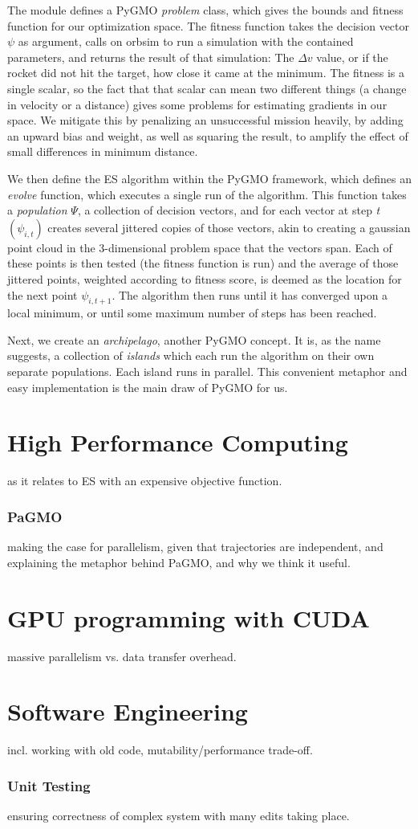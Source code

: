 The module defines a PyGMO \emph{problem} class, which gives the bounds and fitness function for our optimization space. The fitness function takes the decision vector \(\psi\) as argument, calls on orbsim to run a simulation with the contained parameters, and returns the result of that simulation: The \(\Delta v\) value, or if the rocket did not hit the target, how close it came at the minimum. The fitness is a single scalar, so the fact that that scalar can mean two different things (a change in velocity or a distance) gives some problems for estimating gradients in our space. We mitigate this by penalizing an unsuccessful mission heavily, by adding an upward bias and weight, as well as squaring the result, to amplify the effect of small differences in minimum distance.

We then define the ES algorithm within the PyGMO framework, which defines an \emph{evolve} function, which executes a single run of the algorithm. This function takes a \emph{population} \(\Psi\), a collection of decision vectors, and for each vector at step \emph{t} \((\psi_{i,t})\) creates several jittered copies of those vectors, akin to creating a gaussian point cloud in the 3-dimensional problem space that the vectors span. Each of these points is then tested (the fitness function is run) and the average of those jittered points, weighted according to fitness score, is deemed as the location for the next point \(\psi_{i,t+1}\). The algorithm then runs until it has converged upon a local minimum, or until some maximum number of steps has been reached.

Next, we create an \emph{archipelago}, another PyGMO concept. It is, as the name suggests, a collection of \emph{islands} which each run the algorithm on their own separate populations. Each island runs in parallel. This convenient metaphor and easy implementation is the main draw of PyGMO for us. 

\section{High Performance Computing}
as it relates to ES with an expensive objective function.

\subsubsection{PaGMO}
making the case for parallelism, given that trajectories are independent, and explaining the metaphor behind PaGMO, and why we think it useful.

\section{GPU programming with CUDA}
massive parallelism vs. data transfer overhead.

\section{Software Engineering}
incl. working with old code, mutability/performance trade-oﬀ.

\subsubsection{Unit Testing}
ensuring correctness of complex system with many edits taking place.